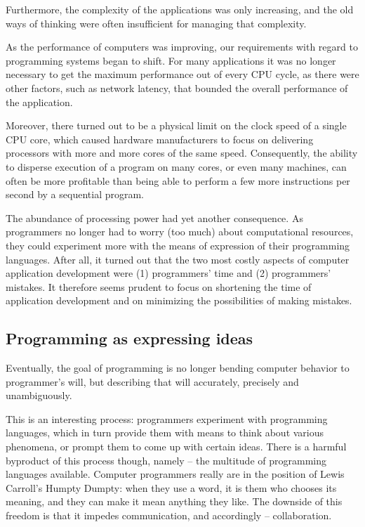 Furthermore, the complexity of the applications was only increasing,
and the old ways of thinking were often insufficient for managing that
complexity.

As the performance of computers was improving, our requirements
with regard to programming systems began to shift. For many applications
it was no longer necessary to get the maximum performance out of every
CPU cycle, as there were other factors, such as network latency, that
bounded the overall performance of the application.

Moreover, there turned out to be a physical limit on the clock speed
of a single CPU core, which caused hardware manufacturers to focus
on delivering processors with more and more cores of the same speed.
Consequently, the ability to disperse execution of a program on many
cores, or even many machines, can often be more profitable than being
able to perform a few more instructions per second by a sequential
program.

The abundance of processing power had yet another consequence.
As programmers no longer had to worry (too much) about computational
resources, they could experiment more with the means of expression
of their programming languages. After all, it turned out that the two
most costly aspects of computer application development were
(1) programmers' time and (2) programmers' mistakes. It therefore
seems prudent to focus on shortening the time of application development
and on minimizing the possibilities of making mistakes.

\subsection{Programming as expressing ideas}

Eventually, the goal of programming is no longer bending computer
behavior to programmer's will, but describing that will accurately,
precisely and unambiguously. 

This is an interesting process: programmers experiment with programming
languages, which in turn provide them with means to think about various
phenomena, or prompt them to come up with certain ideas. There is
a harmful byproduct of this process though, namely -- the multitude
of programming languages available. Computer programmers really are
in the position of Lewis Carroll's Humpty Dumpty: when they use
a word, it is them who chooses its meaning, and they can make it
mean anything they like. The downside of this freedom is that it
impedes communication, and accordingly -- collaboration.

